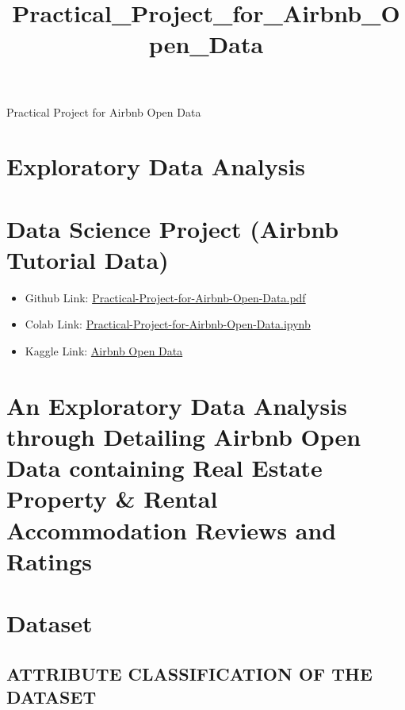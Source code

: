 \documentclass[11pt]{article}
\title{Practical\_Project\_for\_Airbnb\_Open\_Data}
\providecommand{\tightlist}{%
      \setlength{\itemsep}{0pt}\setlength{\parskip}{0pt}}
\begin{document}
    
    \maketitle
    
    

    
    Practical Project for Airbnb Open Data

    \hypertarget{exploratory-data-analysis}{%
\section{Exploratory Data Analysis}\label{exploratory-data-analysis}}

    \hypertarget{data-science-project-airbnb-tutorial-data}{%
\section{Data Science Project (Airbnb Tutorial
Data)}\label{data-science-project-airbnb-tutorial-data}}

\begin{itemize}
\tightlist
\item
  Github Link: \href{}{Practical-Project-for-Airbnb-Open-Data.pdf}
\item
  Colab Link:
  \href{https://colab.research.google.com/drive/1xUeS_hPeF2Zrs31_Q_AKBoRKP0sOk8kd?usp=sharing}{Practical-Project-for-Airbnb-Open-Data.ipynb}
\item
  Kaggle Link:
  \href{https://www.kaggle.com/datasets/arianazmoudeh/airbnbopendata/data}{Airbnb
  Open Data}
\end{itemize}

    \hypertarget{an-exploratory-data-analysis-through-detailing-airbnb-open-data-containing-real-estate-property-rental-accommodation-reviews-and-ratings}{%
\section{An Exploratory Data Analysis through Detailing Airbnb Open Data
containing Real Estate Property \& Rental Accommodation Reviews and
Ratings}\label{an-exploratory-data-analysis-through-detailing-airbnb-open-data-containing-real-estate-property-rental-accommodation-reviews-and-ratings}}

    \hypertarget{dataset}{%
\section{Dataset}\label{dataset}}

    \hypertarget{attribute-classification-of-the-dataset}{%
\subsection{ATTRIBUTE CLASSIFICATION OF THE
DATASET}\label{attribute-classification-of-the-dataset}}
\end{document}
